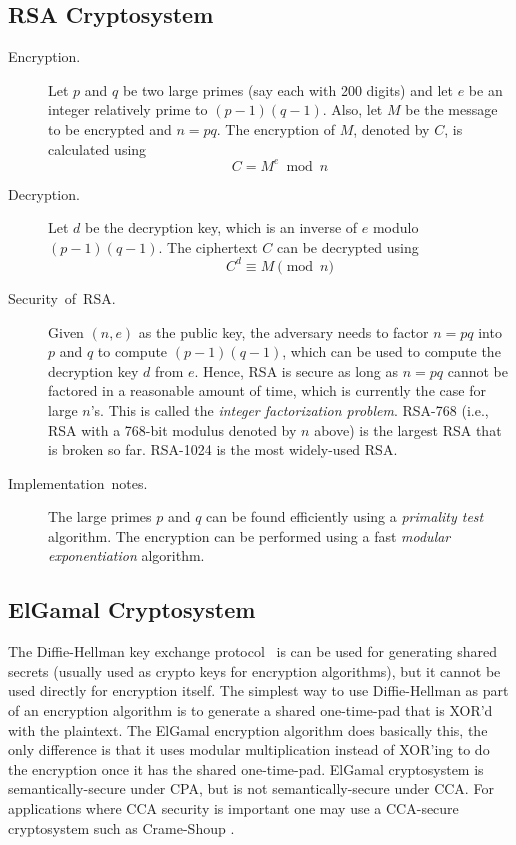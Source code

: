 \documentclass[11pt]{article}
\theoremstyle{plain}
\begin{document}
\subsection{RSA Cryptosystem}
\begin{description}
	\item [{Encryption.}] Let $p$ and $q$ be two large primes (say each with
	200 digits) and let $e$ be an integer relatively prime to $(p-1)(q-1)$.
	Also, let $M$ be the message to be encrypted and $n=pq$. The encryption
	of $M$, denoted by $C$, is calculated using 
	\[
	C=M^{e}\bmod n
	\]
	\item [{Decryption.}] Let $d$ be the decryption key, which is an inverse
	of $e$ modulo $(p-1)(q-1)$. The ciphertext $C$ can be decrypted
	using 
	\[
	C^{d}\equiv M\pmod{n}
	\]
	\item [{Security~of~RSA.}] Given $(n,e)$ as the public key, the adversary
	needs to factor $n=pq$ into $p$ and $q$ to compute $(p-1)(q-1)$,
	which can be used to compute the decryption key $d$ from $e$. Hence,
	RSA is secure as long as $n=pq$ cannot be factored in a reasonable
	amount of time, which is currently the case for large $n$'s. This
	is called the \emph{integer factorization problem}. RSA-768 (i.e.,
	RSA with a 768-bit modulus denoted by $n$ above) is the largest RSA
	that is broken so far. RSA-1024 is the most widely-used RSA.
	\item [{Implementation~notes.}] The large primes $p$ and $q$ can be
	found efficiently using a \emph{primality test} algorithm. The encryption
	can be performed using a fast \emph{modular exponentiation} algorithm.
\end{description}

\subsection{ElGamal Cryptosystem}

The Diffie-Hellman key exchange protocol~\cite{Diffie:2006:NDC:2263321.2269104}
is can be used for generating shared secrets (usually used as crypto
keys for encryption algorithms), but it cannot be used directly for
encryption itself. The simplest way to use Diffie-Hellman as part
of an encryption algorithm is to generate a shared one-time-pad that
is XOR'd with the plaintext. The ElGamal encryption algorithm does
basically this, the only difference is that it uses modular multiplication
instead of XOR'ing to do the encryption once it has the shared one-time-pad.
ElGamal cryptosystem is semantically-secure under CPA, but is not
semantically-secure under CCA. For applications where CCA security
is important one may use a CCA-secure cryptosystem such as Crame-Shoup
\cite{Cramer:1998:PPK:646763.706340}. 
\end{document}
